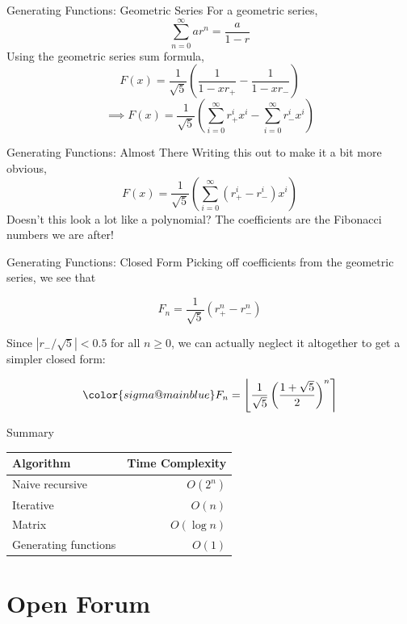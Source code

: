 \documentclass[aspectratio=169, handout]{beamer}
\begin{document}
\begin{frame}{Generating Functions: Geometric Series}
For a geometric series,
$$\sum_{n=0}^\infty ar^n = \frac{a}{1-r}$$\pause
    Using the geometric series sum formula,
    $$F(x) = \frac{1}{\sqrt{5}}\left( 
        \frac{1}{1-xr_+} - \frac{1}{1-xr_-}
    \right)$$\pause
    $$\implies F(x) = \frac{1}{\sqrt{5}}\left(\sum_{i= 0}^\infty r^i_+x^i -  \sum_{i= 0}^\infty r^i_-x^i\right)$$
\end{frame}

\begin{frame}{Generating Functions: Almost There}
 Writing this out to make it a bit more obvious,
 $$F(x) = \frac{1}{\sqrt{5}} \left(\sum_{i = 0}^\infty (r^i_+ - r^i_-)x^i  \right)$$\pause
 Doesn't this look a lot like a polynomial? 
 The coefficients are the Fibonacci numbers we are after!
\end{frame}

\begin{frame}{Generating Functions: Closed Form}
    Picking off coefficients from the geometric series, we see that
    
    $$F_n = \frac{1}{\sqrt{5}}\left(r_+^n - r_-^n \right)$$\pause
    
    Since $|r_-/\sqrt{5}| < 0.5$ for all $n \geq 0$, we can actually neglect it altogether to get a simpler closed form:
    
    $$\color{sigma@mainblue} F_n = \left\lfloor\frac{1}{\sqrt{5}}\left(\frac{1+\sqrt{5}}{2} \right)^n\right\rceil$$
    
\end{frame}

\begin{frame}{Summary}
\centering
    \begin{tabular}{@{}lr@{}}
    \toprule
        Algorithm & Time Complexity \\
    \midrule
        Naive recursive      & $O\left( 2^n \right)$\\
        Iterative            & $O(n)$\\
        Matrix               & $O(\log n)$\\
        Generating functions & $O(1)$\\
    \bottomrule
    \end{tabular}
    
    
\end{frame}


\section{Open Forum}
\frame{\sectionpage}
\end{document}
